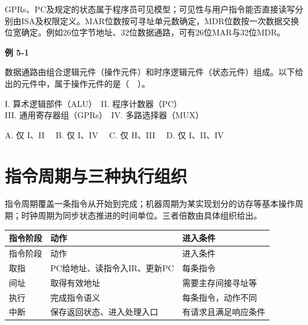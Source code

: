 GPRs、PC及规定的状态属于程序员可见模型；可见性与用户指令能否直接读写分别由ISA及权限定义。MAR位数按可寻址单元数确定，MDR位数按一次数据交换位宽确定。例如26位字节地址、32位数据通路，可有26位MAR与32位MDR。

\par\medskip{}\noindent\hypertarget{CO05-E01}{}\label{CO05-E01}\textbf{例 5-1}\par\nobreak\smallskip

数据通路由组合逻辑元件（操作元件）和时序逻辑元件（状态元件）组成。以下给出的元件中，属于操作元件的是（　）。

I. 算术逻辑部件（ALU）　II. 程序计数器（PC）\\
III. 通用寄存器组（GPRs）　IV. 多路选择器（MUX）

A. 仅 I、II　 B. 仅 I、IV　 C. 仅 II、III　 D. 仅 I、II、IV

\section{指令周期与三种执行组织}\label{CO05-cycle-model}

指令周期覆盖一条指令从开始到完成；机器周期为某实现划分的访存等基本操作周期；时钟周期为同步状态推进的时间单位。三者倍数由具体组织给出。

\par\smallskip
{\fontsize{9.3}{12}\selectfont\setlength{\tabcolsep}{2.5pt}\setlength{\LTleft}{0pt}\setlength{\LTright}{0pt}
\begin{longtable}{@{}>{\raggedright\arraybackslash}p{}>{\raggedright\arraybackslash}p{}>{\raggedright\arraybackslash}p{}@{}}
\toprule
指令阶段 & 动作 & 进入条件 \\

\midrule\endfirsthead\toprule
指令阶段 & 动作 & 进入条件 \\

\midrule\endhead\bottomrule\endfoot
取指 & PC给地址、读指令入IR、更新PC & 每条指令 \\

间址 & 取得有效地址 & 需要主存间接寻址等 \\

执行 & 完成指令语义 & 每条指令，动作不同 \\

中断 & 保存返回状态、进入处理入口 & 有请求且满足响应条件 \\

\end{longtable}}
\par\smallskip

